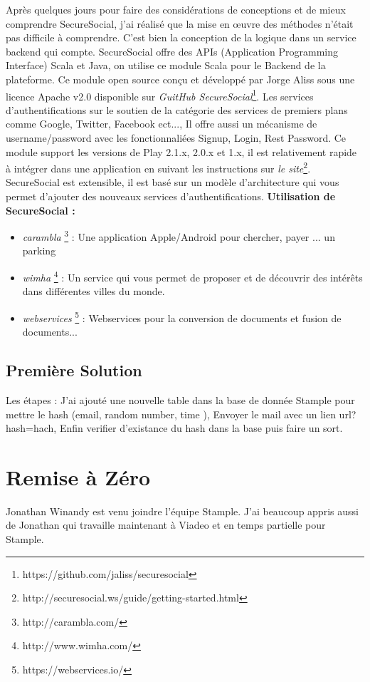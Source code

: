 \documentclass[12pt,oneside,a4paper]{article}
\begin{document}
Après quelques jours pour faire des considérations de conceptions et de mieux comprendre SecureSocial, j'ai réalisé que la mise en œuvre des méthodes n'était pas difficile à comprendre. C'est bien la conception de la logique dans un service backend qui compte. 
SecureSocial offre des APIs (Application Programming Interface) Scala et Java, on utilise ce module Scala pour le Backend de la plateforme.
Ce module open source conçu et développé par Jorge Aliss sous une licence Apache v2.0 disponible sur \textit{GuitHub SecureSocial}\footnote{https://github.com/jaliss/securesocial}. 
Les services d'authentifications sur le soutien de la catégorie des services de premiers plans comme Google, Twitter, Facebook ect..., Il offre aussi un mécanisme de username/password avec les fonctionnaliées Signup, Login, Rest Password.
Ce module support les versions de Play 2.1.x, 2.0.x et 1.x, il est relativement rapide à intégrer dans une application en suivant les instructions sur \textit{le site}\footnote{http://securesocial.ws/guide/getting-started.html}.
SecureSocial est extensible, il est basé sur un modèle d'architecture qui vous permet d'ajouter des nouveaux services d'authentifications.
\newline
\textbf{Utilisation de SecureSocial :}
\begin{itemize}
\item \textit{carambla} \footnote{http://carambla.com/} : Une application Apple/Android pour chercher, payer ... un parking
\item \textit{wimha} \footnote{http://www.wimha.com/} : Un service qui vous permet de proposer et de découvrir des intérêts dans différentes villes du monde.
\item \textit{webservices} \footnote{https://webservices.io/} : Webservices pour la conversion de documents et fusion de documents...
\end{itemize}
\subsection{Première Solution}
Les étapes : 
\newline
J'ai ajouté une nouvelle table dans la base de donnée Stample pour mettre le hash (email, random number, time ),
Envoyer le mail avec un lien url?hash=hach,
Enfin verifier d'existance du hash dans la base puis faire un sort.
 

\section{Remise à Zéro}
Jonathan Winandy est venu joindre l'équipe Stample.
J'ai beaucoup appris aussi de Jonathan qui travaille maintenant à Viadeo et en temps partielle pour Stample.
\end{document}
